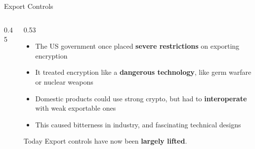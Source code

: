\documentclass[aspectratio=169,11pt,xcolor={table}]{beamer}
\begin{document}
\begin{frame}{Export Controls}
  \begin{columns}[c]
    \begin{column}{0.45\textwidth}
      \centering
    \end{column}
    \begin{column}{0.53\textwidth}
      \begin{itemize}\small\setlength{\itemsep}{4pt}
        \item The US government once placed \textbf{severe restrictions} on exporting encryption
        \item It treated encryption like a \textbf{dangerous technology}, like germ warfare or nuclear weapons
        \item Domestic products could use strong crypto, but had to \textbf{interoperate} with weak exportable ones
        \item This caused bitterness in industry, and fascinating technical designs
      \end{itemize}
      \begin{exampleblock}{Today}
        \small Export controls have now been \textbf{largely lifted}.
      \end{exampleblock}
    \end{column}
  \end{columns}
\end{frame}
\end{document}
